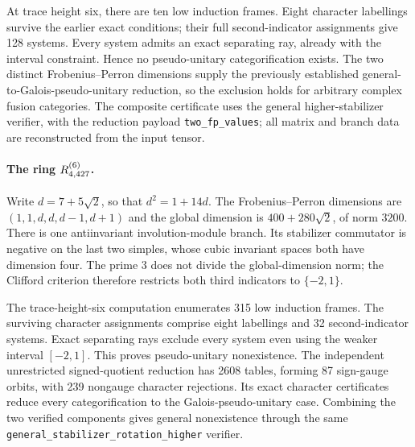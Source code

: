 At trace height six, there are ten low induction frames. Eight character
labellings survive the earlier exact conditions; their full second-indicator
assignments give 128 systems. Every system admits an exact separating ray,
already with the interval constraint. Hence no pseudo-unitary
categorification exists. The two distinct Frobenius--Perron dimensions
supply the previously established general-to-Galois-pseudo-unitary reduction,
so the exclusion holds for arbitrary complex fusion categories.
The composite certificate uses the general higher-stabilizer verifier,
with the reduction payload \texttt{two\_fp\_values}; all matrix and branch
data are reconstructed from the input tensor.

\paragraph{The ring $R^{(6)}_{4,427}$.}
Write $d=7+5\sqrt2$, so that $d^2=1+14d$. The Frobenius--Perron
dimensions are $(1,1,d,d,d-1,d+1)$ and the global dimension is
$400+280\sqrt2$, of norm $3200$. There is one antiinvariant
involution-module branch. Its stabilizer commutator is negative on the
last two simples, whose cubic invariant spaces both have dimension four.
The prime $3$ does not divide the global-dimension norm; the Clifford
criterion therefore restricts both third indicators to $\{-2,1\}$.

The trace-height-six computation enumerates 315 low induction frames.
The surviving character assignments comprise eight labellings and 32
second-indicator systems. Exact separating rays exclude every system
even using the weaker interval $[-2,1]$. This proves pseudo-unitary
nonexistence. The independent unrestricted signed-quotient reduction
has 2608 tables, forming 87 sign-gauge orbits, with 239 nongauge
character rejections. Its exact character certificates reduce every
categorification to the Galois-pseudo-unitary case. Combining the two
verified components gives general nonexistence through the same
\texttt{general\_stabilizer\_rotation\_higher} verifier.
